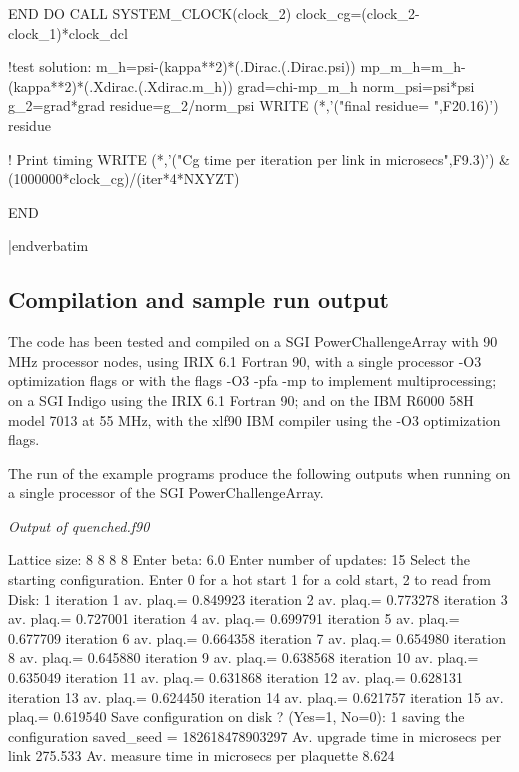 {    END DO
    CALL SYSTEM_CLOCK(clock_2)
    clock_cg=(clock_2-clock_1)*clock_dcl

!test solution:
   m_h=psi-(kappa**2)*(.Dirac.(.Dirac.psi))
   mp_m_h=m_h-(kappa**2)*(.Xdirac.(.Xdirac.m_h))
   grad=chi-mp_m_h
   norm_psi=psi*psi
   g_2=grad*grad
   residue=g_2/norm_psi
   WRITE (*,'("final residue= ",F20.16)') residue

! Print timing
   WRITE (*,'("Cg time per iteration per link in microsecs",F9.3)') &
         (1000000*clock_cg)/(iter*4*NXYZT)

   END

|endverbatim



\subsection{Compilation and sample run output}

The code has been tested and compiled on a SGI PowerChallengeArray 
with 90 MHz processor nodes, using IRIX 6.1 Fortran 90,
with a single processor -O3 optimization flags or 
with the flags -O3 -pfa -mp to implement multiprocessing;
on a SGI Indigo using the IRIX 6.1 Fortran 90;
and on the IBM R6000 58H model 7013 at 55 MHz, 
with the xlf90 IBM compiler using the -O3 optimization flags.

The run of the example programs produce the following
outputs when running on a single processor of 
the SGI PowerChallengeArray.

{\it Output of quenched.f90}

\verbatim

Lattice size:     8    8    8    8
Enter beta:   6.0
Enter number of updates:   15
Select the starting configuration.  Enter 0 for a hot start 
1 for a cold start, 2 to read from Disk: 1
iteration     1 av. plaq.=   0.849923
iteration     2 av. plaq.=   0.773278
iteration     3 av. plaq.=   0.727001
iteration     4 av. plaq.=   0.699791
iteration     5 av. plaq.=   0.677709
iteration     6 av. plaq.=   0.664358
iteration     7 av. plaq.=   0.654980
iteration     8 av. plaq.=   0.645880
iteration     9 av. plaq.=   0.638568
iteration    10 av. plaq.=   0.635049
iteration    11 av. plaq.=   0.631868
iteration    12 av. plaq.=   0.628131
iteration    13 av. plaq.=   0.624450
iteration    14 av. plaq.=   0.621757
iteration    15 av. plaq.=   0.619540
Save configuration on disk ? (Yes=1, No=0): 1
saving the configuration
  saved_seed = 182618478903297
Av. upgrade time in microsecs per link  275.533
Av. measure time in microsecs per plaquette    8.624

}
